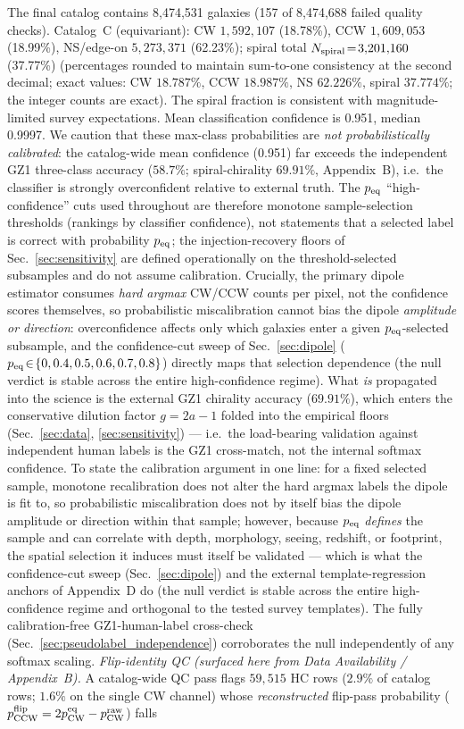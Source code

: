 \documentclass[aps,prd,twocolumn,superscriptaddress,preprintnumbers,nofootinbib,longbibliography,floatfix]{revtex4-2}
\begin{document}
The final catalog contains 8,474,531 galaxies (157 of 8,474,688 failed quality checks). Catalog~C (equivariant): CW $1{,}592{,}107$ (18.78\%), CCW $1{,}609{,}053$ (18.99\%), NS/edge-on $5{,}273{,}371$ (62.23\%); spiral total $N_{\rm spiral}\!=\!3{,}201{,}160$ (37.77\%) (percentages rounded to maintain sum-to-one consistency at the second decimal; exact values: CW $18.787\%$, CCW $18.987\%$, NS $62.226\%$, spiral $37.774\%$; the integer counts are exact). The spiral fraction is consistent with magnitude-limited survey expectations. Mean classification confidence is 0.951, median 0.9997. We caution that these max-class probabilities are \emph{not probabilistically calibrated}: the catalog-wide mean confidence (0.951) far exceeds the independent GZ1 three-class accuracy ($58.7\%$; spiral-chirality $69.91\%$, Appendix~B), i.e.\ the classifier is strongly overconfident relative to external truth. The $p_{\rm eq}$ ``high-confidence'' cuts used throughout are therefore monotone sample-selection thresholds (rankings by classifier confidence), not statements that a selected label is correct with probability $p_{\rm eq}$; the injection-recovery floors of Sec.~\ref{sec:sensitivity} are defined operationally on the threshold-selected subsamples and do not assume calibration. Crucially, the primary dipole estimator consumes \emph{hard argmax} CW/CCW counts per pixel, not the confidence scores themselves, so probabilistic miscalibration cannot bias the dipole \emph{amplitude or direction}: overconfidence affects only which galaxies enter a given $p_{\rm eq}$-selected subsample, and the confidence-cut sweep of Sec.~\ref{sec:dipole} ($p_{\rm eq}\!\in\!\{0,0.4,0.5,0.6,0.7,0.8\}$) directly maps that selection dependence (the null verdict is stable across the entire high-confidence regime). What \emph{is} propagated into the science is the external GZ1 chirality accuracy ($69.91\%$), which enters the conservative dilution factor $g=2a-1$ folded into the empirical floors (Sec.~\ref{sec:data}, \ref{sec:sensitivity}) --- i.e.\ the load-bearing validation against independent human labels is the GZ1 cross-match, not the internal softmax confidence. To state the calibration argument in one line: for a fixed selected sample, monotone recalibration does not alter the hard argmax labels the dipole is fit to, so probabilistic miscalibration does not by itself bias the dipole amplitude or direction within that sample; however, because $p_{\rm eq}$ \emph{defines} the sample and can correlate with depth, morphology, seeing, redshift, or footprint, the spatial selection it induces must itself be validated --- which is what the confidence-cut sweep (Sec.~\ref{sec:dipole}) and the external template-regression anchors of Appendix~D do (the null verdict is stable across the entire high-confidence regime and orthogonal to the tested survey templates). The fully calibration-free GZ1-human-label cross-check (Sec.~\ref{sec:pseudolabel_independence}) corroborates the null independently of any softmax scaling. \emph{Flip-identity QC (surfaced here from Data Availability / Appendix~B).} A catalog-wide QC pass flags $59{,}515$ HC rows ($2.9\%$ of catalog rows; $1.6\%$ on the single CW channel) whose \emph{reconstructed} flip-pass probability ($p_{\rm CCW}^{\rm flip}=2p_{\rm CW}^{\rm eq}-p_{\rm CW}^{\rm raw}$) falls 
\end{document}
